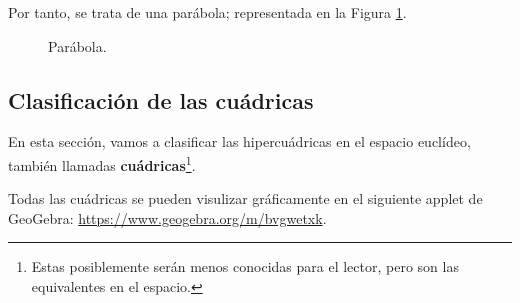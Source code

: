 \begin{enumerate}
    Por tanto, se trata de una parábola; representada en la Figura \ref{fig:Parabola}.
    \begin{figure}
        \centering
        \caption{Parábola.}
        \label{fig:Parabola}
    \end{figure}
    
\end{enumerate}



\subsection{Clasificación de las cuádricas}

En esta sección, vamos a clasificar las hipercuádricas en el espacio euclídeo, también llamadas \textbf{cuádricas}\footnote{Estas posiblemente serán menos conocidas para el lector, pero son las equivalentes en el espacio.}.

Todas las cuádricas se pueden visulizar gráficamente en el siguiente applet de GeoGebra: \href{https://www.geogebra.org/m/bvgwetxk}{https://www.geogebra.org/m/bvgwetxk}.

